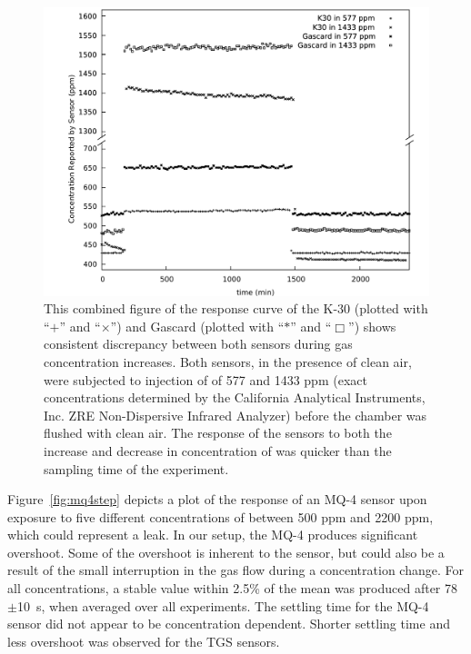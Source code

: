 \documentclass[sensors,article,submit,moreauthors,pdftex]{Definitions/mdpi}
\begin{document}
			\begin{figure}[!t]
				\centering
				\includegraphics[width=\columnwidth]{honey3.pdf}
				\caption{%
					This combined figure of the response curve of the K-30 (plotted with ``$+$'' and ``$\times$'') and Gascard (plotted with ``$\ast$'' and ``$\Box$'') shows consistent discrepancy between both sensors during gas concentration increases.
					Both sensors, in the presence of clean air, were subjected to injection of  of 577 and 1433 ppm (exact concentrations determined by the California Analytical Instruments, Inc. ZRE Non-Dispersive Infrared Analyzer) before the chamber was flushed with clean air.
					The response of the sensors to both the increase and decrease in concentration of  was quicker than the sampling time of the experiment.
				}
				\label{fig:peakdetailco2}
			\end{figure}
			
			Figure~\ref{fig:mq4step} depicts a plot of the response of an MQ-4 sensor upon exposure to five different concentrations of  between 500 ppm and 2200 ppm, which could represent a  leak.
			In our setup, the MQ-4 produces significant overshoot.
			Some of the overshoot is inherent to the sensor, but could also be a result of the small interruption in the gas flow during a concentration change.
			For all concentrations, a stable value within 2.5\% of the mean was produced after 78$\pm$\SI{10}{\second}, when averaged over all experiments.
			The settling time for the MQ-4 sensor did not appear to be concentration dependent. Shorter settling time and less overshoot was observed for the TGS sensors.
			
\end{document}
